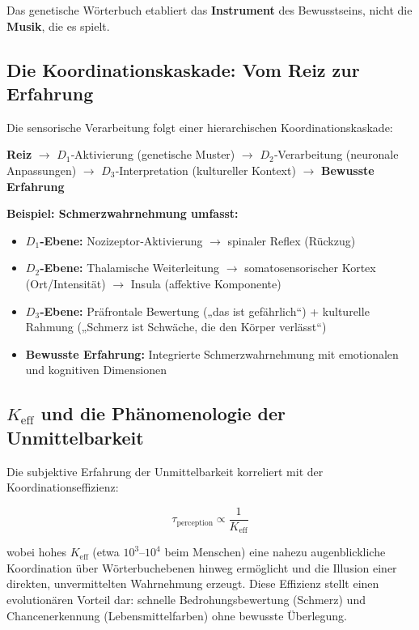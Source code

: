 \documentclass[12pt,a4paper]{article}
\newcommand{\eff}{\mathrm{eff}}
\newcommand{\Ke}{K_{\eff}}
\begin{document}
	Das genetische Wörterbuch etabliert das \textbf{Instrument} des Bewusstseins, nicht die \textbf{Musik}, die es spielt.
	
	\subsection{Die Koordinationskaskade: Vom Reiz zur Erfahrung}
	
	Die sensorische Verarbeitung folgt einer hierarchischen Koordinationskaskade:
	
	\begin{center}
		\textbf{Reiz} $\rightarrow$ $D_1$‑Aktivierung (genetische Muster) $\rightarrow$ $D_2$‑Verarbeitung (neuronale Anpassungen) $\rightarrow$ $D_3$‑Interpretation (kultureller Kontext) $\rightarrow$ \textbf{Bewusste Erfahrung}
	\end{center}
	
	\textbf{Beispiel: Schmerzwahrnehmung umfasst:}
	\begin{itemize}
		\item \textbf{$D_1$‑Ebene:} Nozizeptor‑Aktivierung $\rightarrow$ spinaler Reflex (Rückzug)
		\item \textbf{$D_2$‑Ebene:} Thalamische Weiterleitung $\rightarrow$ somatosensorischer Kortex (Ort/Intensität) $\rightarrow$ Insula (affektive Komponente)
		\item \textbf{$D_3$‑Ebene:} Präfrontale Bewertung („das ist gefährlich“) + kulturelle Rahmung („Schmerz ist Schwäche, die den Körper verlässt“)
		\item \textbf{Bewusste Erfahrung:} Integrierte Schmerzwahrnehmung mit emotionalen und kognitiven Dimensionen
	\end{itemize}
	
	\subsection{$\Ke$ und die Phänomenologie der Unmittelbarkeit}
	
	Die subjektive Erfahrung der Unmittelbarkeit korreliert mit der Koordinationseffizienz:
	
	\[
	\tau_{\text{perception}} \propto \frac{1}{\Ke}
	\]
	
	wobei hohes $\Ke$ (etwa $10^3$–$10^4$ beim Menschen) eine nahezu augenblickliche Koordination über Wörterbuchebenen hinweg ermöglicht und die Illusion einer direkten, unvermittelten Wahrnehmung erzeugt. Diese Effizienz stellt einen evolutionären Vorteil dar: schnelle Bedrohungsbewertung (Schmerz) und Chancenerkennung (Lebensmittelfarben) ohne bewusste Überlegung.
	
\end{document}
